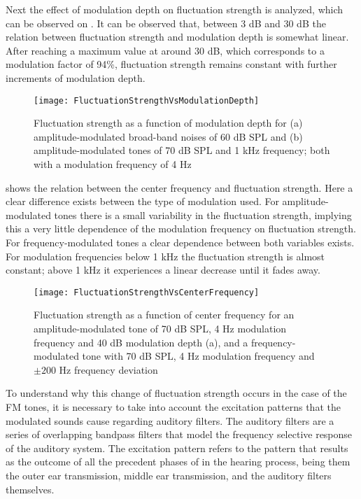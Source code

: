 \documentclass[../main.tex]{subfiles}
\begin{document}
\begin{theoreticalbackground}
Next the effect of modulation depth on fluctuation strength is analyzed, which
can be observed on . It can be observed that,
between 3 dB and 30 dB the relation between fluctuation strength and modulation
depth is somewhat linear. After reaching a maximum value at around 30 dB, which
corresponds to a modulation factor of 94\%, fluctuation strength remains
constant with further increments of modulation depth.

\begin{figure}
  \centering
  \texttt{[image: FluctuationStrengthVsModulationDepth]}
  \caption{Fluctuation strength as a function of modulation depth for (a)
    amplitude-modulated broad-band noises of 60 dB SPL and (b)
    amplitude-modulated tones of 70 dB SPL and 1 kHz frequency; both with a
    modulation frequency of 4 Hz~\cite[pp.~249]{Fastl2007Psychoacoustics}}
\label{fig:flucstrenvsmoddep}
\end{figure}

 shows the relation between the center
frequency and fluctuation strength. Here a clear difference exists between the
type of modulation used. For amplitude-modulated tones there is a small
variability in the fluctuation strength, implying this a very little dependence
of the modulation frequency on fluctuation strength. For frequency-modulated
tones a clear dependence between both variables exists. For modulation
frequencies below 1 kHz the fluctuation strength is almost constant; above 1 kHz
it experiences a linear decrease until it fades away.

\begin{figure}
    \centering
    \texttt{[image: FluctuationStrengthVsCenterFrequency]}
    \caption{Fluctuation strength as a function of center frequency for an
        amplitude-modulated tone of 70 dB SPL, 4 Hz modulation frequency and 40
        dB modulation depth (a), and a frequency-modulated tone with 70 dB SPL,
        4 Hz modulation frequency and $\pm200$ Hz frequency deviation
        \cite[pp. 250]{Fastl2007Psychoacoustics}}
    \label{fig:flucstrenvscfreq}
\end{figure}

To understand why this change of fluctuation strength occurs in the case of the
\gls{FM} tones, it is necessary to take into account the excitation
patterns that the modulated sounds cause regarding auditory filters. The
auditory filters are a series of overlapping bandpass filters that model the
frequency selective response of the auditory system. The excitation pattern
refers to the pattern that results as the outcome of all the precedent phases of
in the hearing process, being them the outer ear transmission, middle ear
transmission, and the auditory filters themselves.


\end{theoreticalbackground}
\end{document}
